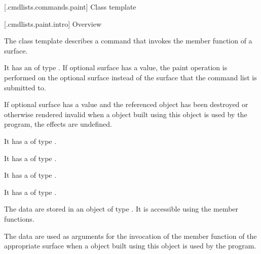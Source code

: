 
 [\iotwod.cmdlists.commands.paint] {Class template }

 [\iotwod.cmdlists.paint.intro] {Overview}

\pnum
{}%
The class template  describes a command that invokes the  member function of a surface.

\pnum
It has an  of type . If optional surface has a value, the paint operation is performed on the optional surface instead of the surface that the command list is submitted to.

\pnum
If optional surface has a value and the referenced  object has been destroyed or otherwise rendered invalid when a  object built using this  object is used by the program, the effects are undefined.

\pnum
It has a  of type .

\pnum
It has a  of type .

\pnum
It has a  of type .

\pnum
It has a  of type .

\pnum
The data are stored in an object of type . It is accessible using the  member functions.

\pnum
The data are used as arguments for the invocation of the  member function of the appropriate surface when a  object built using this  object is used by the program.

